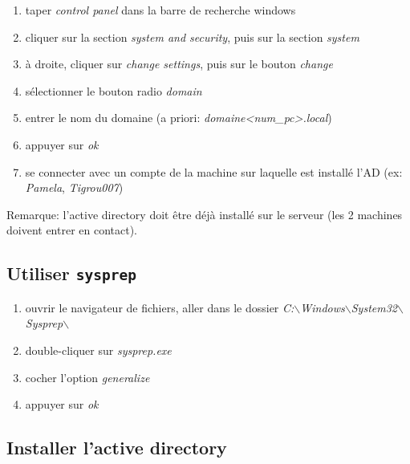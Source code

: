 \documentclass[a4paper]{article}
\begin{document}
\begin{enumerate}
    \item taper \textit{control panel} dans la barre de recherche windows
    \item cliquer sur la section \textit{system and security}, puis sur la section \textit{system}
    \item à droite, cliquer sur \textit{change settings}, puis sur le bouton \textit{change}
    \item sélectionner le bouton radio \textit{domain}
    \item entrer le nom du domaine (a priori: \textit{domaine<num\_pc>.local})
    \item appuyer sur \textit{ok}
    \item se connecter avec un compte de la machine sur laquelle est installé l'AD (ex: \textit{Pamela}, \textit{Tigrou007})
\end{enumerate}
Remarque: l'active directory doit être déjà installé sur le serveur (les 2 machines doivent entrer en contact).





\subsection{Utiliser \texttt{sysprep}}



\begin{enumerate}
    \item ouvrir le navigateur de fichiers, aller dans le dossier \textit{C:$\backslash$Windows$\backslash$System32$\backslash$Sysprep$\backslash$}
    \item double-cliquer sur \textit{sysprep.exe}
    \item cocher l'option \textit{generalize}
    \item appuyer sur \textit{ok}
\end{enumerate}





\subsection{Installer l'active directory}
\end{document}
